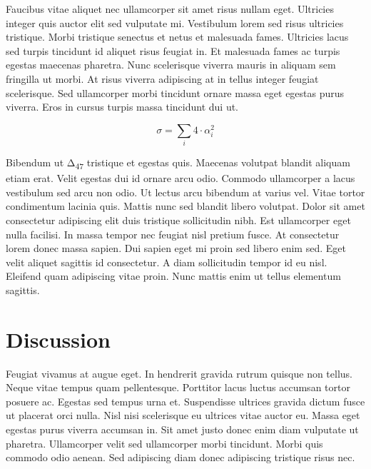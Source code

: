 Faucibus vitae aliquet nec ullamcorper sit amet risus nullam eget.
Ultricies integer quis auctor elit sed vulputate mi. Vestibulum lorem
sed risus ultricies tristique. Morbi tristique senectus et netus et
malesuada fames. Ultricies lacus sed turpis tincidunt id aliquet risus
feugiat in. Et malesuada fames ac turpis egestas maecenas pharetra. Nunc
scelerisque viverra mauris in aliquam sem fringilla ut morbi. At risus
viverra adipiscing at in tellus integer feugiat scelerisque. Sed
ullamcorper morbi tincidunt ornare massa eget egestas purus viverra.
Eros in cursus turpis massa tincidunt dui ut.

\begin{equation}
\sigma = \sum_i4\cdot α^2_i
\label{eq:foo}
\end{equation}

Bibendum ut Δ\textsubscript{47} tristique et egestas quis. Maecenas
volutpat blandit aliquam etiam erat. Velit egestas dui id ornare arcu
odio. Commodo ullamcorper a lacus vestibulum sed arcu non odio. Ut
lectus arcu bibendum at varius vel. Vitae tortor condimentum lacinia
quis. Mattis nunc sed blandit libero volutpat. Dolor sit amet
consectetur adipiscing elit duis tristique sollicitudin nibh. Est
ullamcorper eget nulla facilisi. In massa tempor nec feugiat nisl
pretium fusce. At consectetur lorem donec massa sapien. Dui sapien eget
mi proin sed libero enim sed. Eget velit aliquet sagittis id
consectetur. A diam sollicitudin tempor id eu nisl. Eleifend quam
adipiscing vitae proin. Nunc mattis enim ut tellus elementum sagittis.

\hypertarget{discussion}{%
\section{Discussion}\label{discussion}}

Feugiat vivamus at augue eget. In hendrerit gravida rutrum quisque non
tellus. Neque vitae tempus quam pellentesque. Porttitor lacus luctus
accumsan tortor posuere ac. Egestas sed tempus urna et. Suspendisse
ultrices gravida dictum fusce ut placerat orci nulla. Nisl nisi
scelerisque eu ultrices vitae auctor eu. Massa eget egestas purus
viverra accumsan in. Sit amet justo donec enim diam vulputate ut
pharetra. Ullamcorper velit sed ullamcorper morbi tincidunt. Morbi quis
commodo odio aenean. Sed adipiscing diam donec adipiscing tristique
risus nec.

